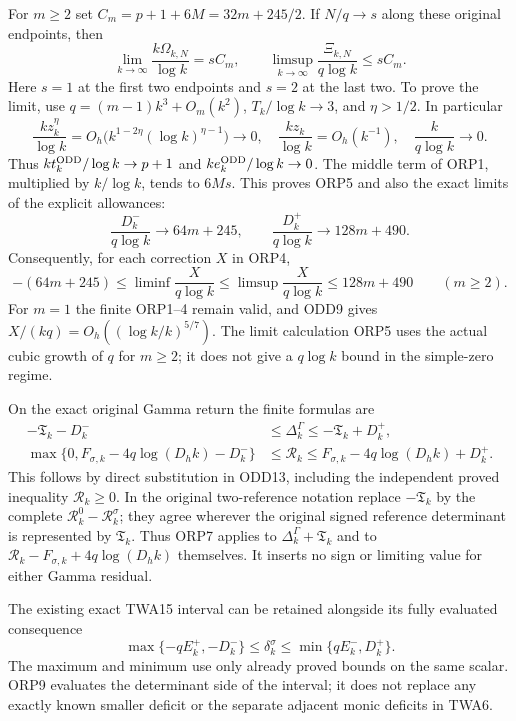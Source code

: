 For $m\geq2$ set $C_m=p+1+6M=32m+245/2$. If $N/q\to s$
along these original endpoints, then
\[
 \lim_{k\to\infty}\frac{k\Omega_{k,N}}{\log k}=sC_m,
 \qquad
 \limsup_{k\to\infty}\frac{\Xi_{k,N}}{q\log k}\leq sC_m.
 \tag{ORP5}
\]
Here $s=1$ at the first two endpoints and $s=2$ at the last
two. To prove the limit, use $q=(m-1)k^3+O_m(k^2)$,
$T_k/\log k\to3$, and $\eta>1/2$. In particular
\[
 \frac{kz_k^\eta}{\log k}
   =O_h\bigl(k^{1-2\eta}(\log k)^{\eta-1}\bigr)\longrightarrow0,
 \quad
 \frac{kz_k}{\log k}=O_h(k^{-1}),
 \quad \frac{k}{q\log k}\longrightarrow0.
\]
Thus $kt_k^{\rm ODD}/\log k\to p+1$ and
$ke_k^{\rm ODD}/\log k\to0$. The middle term of ORP1,
multiplied by $k/\log k$, tends to $6Ms$. This proves ORP5
and also the exact limits of the explicit allowances:
\[
 \frac{D_k^-}{q\log k}\longrightarrow64m+245,
 \qquad
 \frac{D_k^+}{q\log k}\longrightarrow128m+490.
 \tag{ORP6}
\]
Consequently, for each correction $X$ in ORP4,
\[
 -(64m+245)\leq\liminf\frac{X}{q\log k}
       \leq\limsup\frac{X}{q\log k}\leq128m+490
 \qquad(m\geq2).
 \tag{ORP7}
\]
For $m=1$ the finite ORP1--4 remain valid, and ODD9 gives
$X/(kq)=O_h((\log k/k)^{5/7})$. The limit calculation ORP5
uses the actual cubic growth of $q$ for $m\geq2$; it does
not give a $q\log k$ bound in the simple-zero regime.

On the exact original Gamma return the finite formulas are
\[
\begin{aligned}
 -\mathfrak T_k-D_k^-&\leq\Delta_k^\Gamma
                          \leq-\mathfrak T_k+D_k^+,\\
 \max\{0,F_{\sigma,k}-4q\log(D_hk)-D_k^-\}
       &\leq\mathcal R_k
          \leq F_{\sigma,k}-4q\log(D_hk)+D_k^+.
\end{aligned}\tag{ORP8}
\]
This follows by direct substitution in ODD13, including the
independent proved inequality $\mathcal R_k\geq0$.
In the original two-reference notation replace
$-\mathfrak T_k$ by the complete
$\mathcal R_k^0-\mathcal R_k^\sigma$; they agree wherever
the original signed reference determinant is represented by
$\mathfrak T_k$. Thus ORP7 applies to
$\Delta_k^\Gamma+\mathfrak T_k$ and to
$\mathcal R_k-F_{\sigma,k}+4q\log(D_hk)$ themselves.
It inserts no sign or limiting value for either Gamma residual.

The existing exact TWA15 interval can be retained alongside its
fully evaluated consequence
\[
 \max\{-qE_k^+,-D_k^-\}\leq\delta_k^\sigma
       \leq\min\{qE_k^-,D_k^+\}.
 \tag{ORP9}
\]
The maximum and minimum use only already proved bounds on the
same scalar. ORP9 evaluates the determinant side of the interval;
it does not replace any exactly known smaller deficit or the
separate adjacent monic deficits in TWA6.
